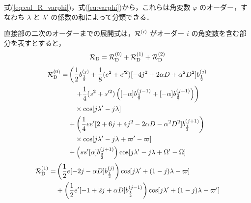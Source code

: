 \documentclass[11pt,a4paper,oneside,onecolumn]{jreport}
\begin{document}
式(\ref{eq:cal_R_varphi})，式(\ref{eq:varphi})から，これらは角変数 $\varphi$ のオーダー，すなわち $\lambda$ と $\lambda'$ の係数の和によって分類できる．

直接部の二次のオーダーまでの展開式は，${\cal R}^{(i)}$ がオーダー $i$ の角変数を含む部分を表すとすると，
\begin{equation}
{\cal R}_{\rm D} =  {\cal R}_{\rm D}^{(0)} + {\cal R}_{\rm D}^{(1)} + {\cal R}_{\rm D}^{(2)} \label{eq:cal_RD(012)}
\end{equation}
\begin{equation}
\begin{split}
{\cal R}_{\rm D}^{(0)} = & \left( \frac{1}{2} b_{ \frac{1}{2} }^{(j)} + \frac{1}{8} (e^2 + e'^2) [ -4 j^2 + 2 \alpha D + \alpha^2 D^2 ] b_{ \frac{1}{2} }^{(j)} \right. \\
& \left. \quad + \frac{1}{4} (s^2 + s'^2) \left( [- \alpha ] b_{ \frac{3}{2} }^{(j - 1)} + [- \alpha ] b_{ \frac{3}{2} }^{(j + 1)} \right) \right) \\
& \quad \times \cos [j \lambda' - j \lambda ] \\
& + \left( \frac{1}{4} e e' [ 2 + 6j + 4 j^2 - 2 \alpha D - \alpha^2 D^2] b_{ \frac{1}{2} }^{(j + 1)} \right) \\
& \quad \times \cos [j \lambda' - j \lambda + \varpi' - \varpi ] \\
& + \left( s s' [ \alpha ] b_{ \frac{3}{2} }^{(j + 1)} \right) \cos [ j \lambda' - j \lambda + \Omega' - \Omega ]
\end{split} \label{eq:cal_RD(0)}
\end{equation}
\begin{equation}
\begin{split}
{\cal R}_{\rm D}^{(1)} = & \left( \frac{1}{2} e [-2 j - \alpha D] b_{ \frac{1}{2} }^{(j)} \right) \cos [j \lambda' + (1 -j) \lambda - \varpi ] \\
& + \left( \frac{1}{2} e' [ -1 + 2 j + \alpha D] b_{ \frac{1}{2} }^{(j - 1)} \right) \cos [j \lambda' + (1 -j) \lambda - \varpi' ]
\end{split}  \label{eq:cal_RD(1)}
\end{equation}
\end{document}
